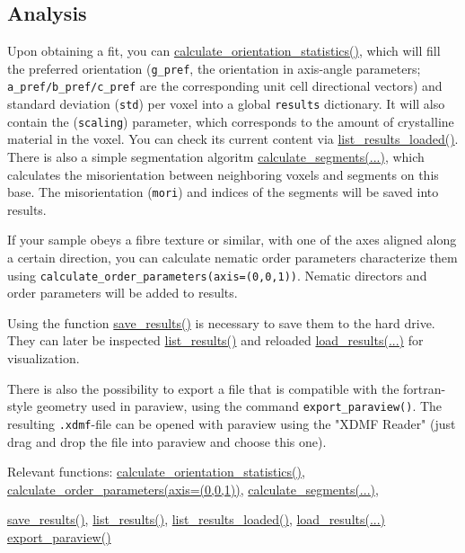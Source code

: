 \subsection{Analysis}
Upon obtaining a fit, you can \hyperref[fun:calculateorientationstatistics]{calculate\_orientation\_statistics()},
which will fill the preferred orientation (\texttt{g\_pref}, the orientation in axis-angle parameters; 
\texttt{a\_pref/b\_pref/c\_pref} are the corresponding unit cell directional vectors)
and standard deviation (\texttt{std}) per voxel into a global \texttt{results} dictionary.
It will also contain the (\texttt{scaling}) parameter, which corresponds to the amount of crystalline material
in the voxel.
You can check its current content via \hyperref[fun:listresultsloaded]{list\_results\_loaded()}.
There is also a simple segmentation algoritm \hyperref[fun:calculatesegments]{calculate\_segments(...)},
which calculates the misorientation between neighboring voxels
and segments on this base. The misorientation (\texttt{mori}) and indices of the segments will be saved
into results.

If your sample obeys a fibre texture or similar, with one of the axes aligned along a certain direction, you can
calculate nematic order parameters characterize them using \texttt{calculate\_order\_parameters(axis=(0,0,1))}.
Nematic directors and order parameters will be added to results.

Using the function \hyperref[fun:saveresults]{save\_results()} is necessary to save them to the hard drive.
They can later be inspected \hyperref[fun:listresults]{list\_results()} and reloaded \hyperref[fun:loadresults]{load\_results(...)}
for visualization.

There is also the possibility to export a file that is compatible with the fortran-style geometry used in paraview,
using the command \texttt{export\_paraview()}. The resulting \texttt{.xdmf}-file can be opened with paraview using the
"XDMF Reader" (just drag and drop the file into paraview and choose this one).

Relevant functions:
\hyperref[fun:calculateorientationstatistics]{calculate\_orientation\_statistics()},
\hyperref[fun:calculateorderparameters]{calculate\_order\_parameters(axis=(0,0,1))},
\hyperref[fun:calculatesegments]{calculate\_segments(...)},

\hyperref[fun:saveresults]{save\_results()},
\hyperref[fun:listresults]{list\_results()},
\hyperref[fun:listresultsloaded]{list\_results\_loaded()},
\hyperref[fun:loadresults]{load\_results(...)}
\hyperref[fun:exportparaview]{export\_paraview()}


